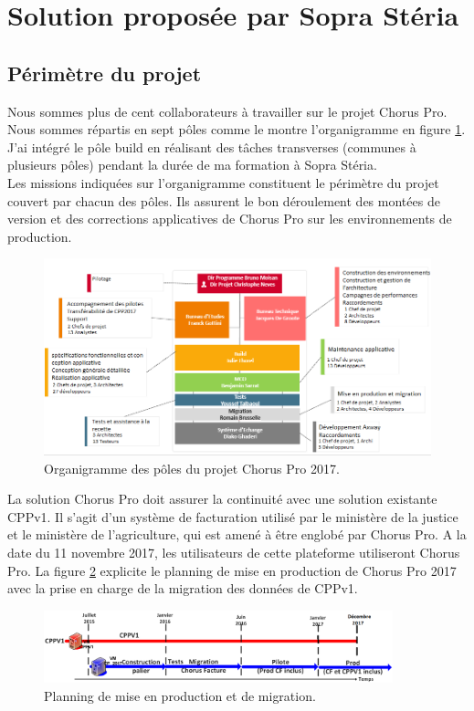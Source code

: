 \documentclass[12pt,a4paper]{article}
\begin{document}
\section{Solution proposée par Sopra Stéria}
\subsection{Périmètre du projet}
Nous sommes plus de cent collaborateurs à travailler sur le projet Chorus Pro. Nous sommes répartis en sept pôles comme le montre l'organigramme en figure \ref{organigramme}. J'ai intégré le pôle build en réalisant des tâches transverses (communes à plusieurs pôles) pendant la durée de ma formation à Sopra Stéria.\\
Les missions indiquées sur l'organigramme constituent le périmètre du projet couvert par chacun des pôles. Ils assurent le bon déroulement des montées de version et des corrections applicatives de Chorus Pro sur les environnements de production.\\
\begin{figure}[!hp]
		\begin{center}
			\includegraphics[width=1.1\textwidth,keepaspectratio]{organigramme.png}
			\caption{Organigramme des pôles du projet Chorus Pro 2017.}
			\label{organigramme}
		\end{center}
\end{figure}
\clearpage
\newpage
La solution Chorus Pro doit assurer la continuité avec une solution existante CPPv1. Il s'agit d'un système de facturation utilisé par le ministère de la justice et le ministère de l’agriculture, qui est amené à être englobé par Chorus Pro. A la date du 11 novembre 2017, les utilisateurs de cette plateforme utiliseront Chorus Pro. La figure \ref{friseCpp} explicite le planning de mise en production de Chorus Pro 2017 avec la prise en charge de la migration des données de CPPv1.
\begin{figure}[!hp]
		\begin{center}
			\includegraphics[width=0.9\textwidth,keepaspectratio]{friseCpp.png}
			\caption{Planning de mise en production et de migration.}
			\label{friseCpp}
		\end{center}
\end{figure}
\end{document}
